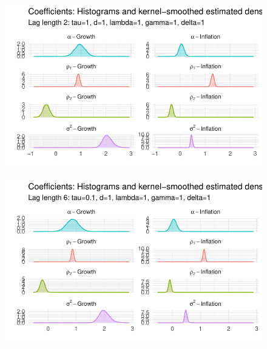 \documentclass[
  letterpaper,
]{book}
\begin{document}
\begin{figure}

{\centering \includegraphics{BVAR_files/figure-pdf/unnamed-chunk-9-2.pdf}

}

\end{figure}

\begin{figure}

{\centering \includegraphics{BVAR_files/figure-pdf/unnamed-chunk-9-3.pdf}

}

\end{figure}
\end{document}
